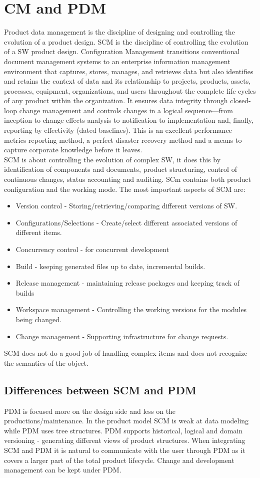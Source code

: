 \documentclass{article}
\begin{document}
\section{CM and PDM}
Product data management is the discipline of designing and controlling the evolution of a product design. SCM is the discipline of controlling the evolution of a SW product design.
Configuration Management transitions conventional document management systems to an
enterprise information management environment that captures, stores, manages, and retrieves
data but also identifies and retains the context of data and its relationship to projects, products,
assets, processes, equipment, organizations, and users throughout the complete life cycles of any
product within the organization. It ensures data integrity through closed-loop change management and
controls changes in a logical sequence—from inception to change-effects analysis to notification
to implementation and, finally, reporting by effectivity (dated baselines). This is an excellent
performance metrics reporting method, a perfect disaster recovery method and a means to
capture corporate knowledge before it leaves. \\
SCM is about controlling the evolution of complex SW, it does this by identification of components and documents, product structuring, control of continuous changes,
status accounting and auditing. SCm contains both product configuration and the working mode.
The most important aspects of SCM are:
\begin{itemize}
    \item Version control - Storing/retrieving/comparing different versions of SW.
    \item Configurations/Selections - Create/select different associated versions of different items.
    \item Concurrency control - for concurrent development
    \item Build - keeping generated files  up to date, incremental builds.
    \item Release management - maintaining release packages and keeping track of builds 
    \item Workspace management - Controlling the working versions for the modules being changed.
    \item Change management - Supporting infrastructure for change requests.
\end{itemize}
SCM does not do a good job of handling complex items and does not recognize the semantics of the object.
\subsection{Differences between SCM and PDM}
PDM is focused more on the design side and less on the productions/maintenance.
In the product model SCM  is weak at data modeling while PDM uses tree structures. PDM supports historical, logical and domain versioning - generating different views of product structures.
When integrating SCM and PDM it is natural to communicate with the user through PDM as it covers a larger part of the total product lifecycle. Change and development management can be kept under PDM.
\end{document}
